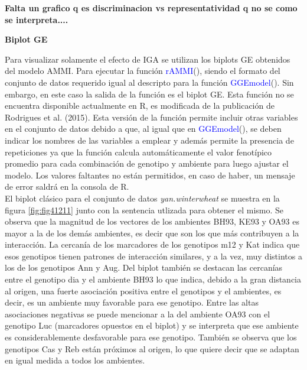\textbf{Falta un grafico q es discriminacion vs representatividad q no se como se interpreta....}

\textbf{Biplot GE}


Para visualizar solamente el efecto de IGA se utilizan los biplots GE obtenidos del modelo AMMI. Para ejecutar la función \textcolor{blue}{rAMMI}(), siendo el formato del conjunto de datos requerido igual al descripto para la función \textcolor{blue}{GGEmodel}(). Sin embargo, en este caso la salida de la función es el biplot GE. Esta función no se encuentra disponible actualmente en R, es modificada de la publicación de Rodrigues et al. (2015). Esta versión de la función permite incluir otras variables en el conjunto de datos debido a que, al igual que en \textcolor{blue}{GGEmodel}(), se deben indicar los nombres de las variables a emplear y además permite la presencia de repeticiones ya que la función calcula automáticamente el valor fenotípico promedio para cada combinación de genotipo y ambiente para luego ajustar el modelo. Los valores faltantes no están permitidos, en caso de haber, un mensaje de error saldrá en la consola de R.\\ 


El biplot clásico para el conjunto de datos \emph{yan.winterwheat} se muestra en la figura \ref{fig:fig41211} junto con la sentencia utlizada para obtener el mismo. Se observa que la magnitud de los vectores de los ambientes BH93, KE93 y OA93 es mayor a la de los demás ambientes, es decir que son los que más contribuyen a la interacción. La cercanía de los marcadores de los genotipos m12 y Kat indica que esos genotipos tienen patrones de interacción similares, y a la vez, muy distintos a los de los genotipos Ann y Aug. Del biplot también se destacan las cercanías entre el genotipo dia y el ambiente BH93 lo que indica, debido a la gran distancia al origen, una fuerte asociación positiva entre el genotipos y el ambientes, es decir, es un ambiente muy favorable para ese genotipo.
Entre las altas asociaciones negativas se puede mencionar a la del ambiente OA93 con el genotipo Luc (marcadores opuestos en el biplot) y se interpreta que ese ambiente es considerablemente desfavorable para ese genotipo. También se observa que los genotipos Cas y Reb están próximos al origen, lo que quiere decir que se adaptan en igual medida a todos los ambientes.


